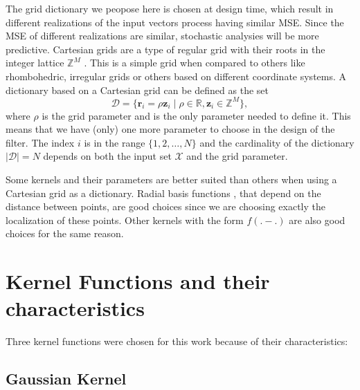 The grid dictionary we peopose here is chosen at design time, which result in different realizations of the input vectors process having similar MSE. Since the MSE of different realizations are similar, stochastic analysies will be more predictive. Cartesian grids \cite{thompson_handbook_1999} are a type of regular grid with their roots in the integer lattice $\mathbb{Z}^M$ \cite{conway_sphere_1993}. This is a simple grid when compared to others like rhombohedric, irregular grids or others based on different coordinate systems. A dictionary based on a Cartesian grid can be defined as the set
\begin{equation}
    \mathcal{D} = \{ \mathbf{r}_i = \rho\mathbf{z}_i\;|\;\rho \in \mathbb{R}, \mathbf{z}_i \in \mathbb{Z}^M \},\label{eq:grid}
\end{equation}
where $\rho$ is the grid parameter and is the only parameter needed to define it. This means that we have (only) one more parameter to choose in the design of the filter. The index $i$ is in the range $\{1, 2, \dots, N\} $ and the cardinality of the dictionary $|\mathcal{D}| = N$ depends on both the input set $\mathcal{X}$ and the grid parameter.

Some kernels and their parameters are better suited than others when using a Cartesian grid as a dictionary. Radial basis functions \cite{buhmann_radial_2003,scholkopf_learning_2002}, that depend on the distance between points, are good choices since we are choosing exactly the localization of these points. Other kernels with the form $f(.-.)$ are also good choices for the same reason.

\section{Kernel Functions and their characteristics}

Three kernel functions were chosen for this work because of their characteristics: 

\subsection{Gaussian Kernel}

